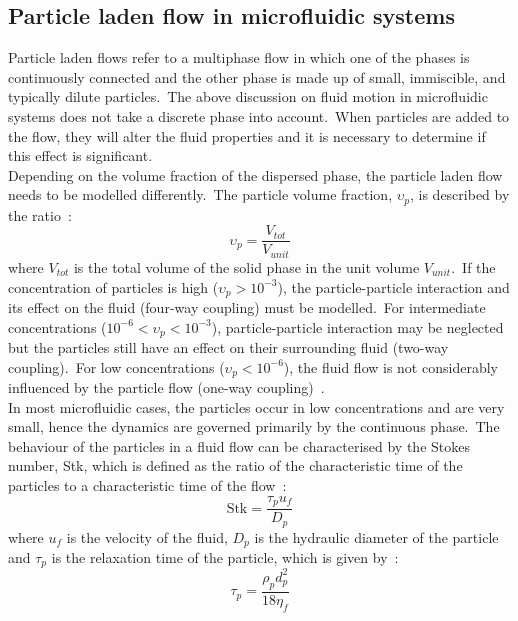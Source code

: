 \subsection{Particle laden flow in microfluidic systems}\label{subsec:particleLadenFlowInMicrofluidicSystems}
Particle laden flows refer to a multiphase flow in which one of the phases is continuously connected and the other phase is made up of small, immiscible, and typically dilute particles.\ The above discussion on fluid motion in microfluidic systems does not take a discrete phase into account.\ When particles are added to the flow, they will alter the fluid properties and it is necessary to determine if this effect is significant.\\
Depending on the volume fraction of the dispersed phase, the particle laden flow needs to be modelled differently.\ The particle volume fraction, $\upsilon_{p}$, is described by the ratio~\cite{Elghobashi1994}:\
\begin{equation}
	\upsilon_{p} = \frac{V_{tot}}{V_{unit}}
\end{equation}
where $V_{tot}$ is the total volume of the solid phase in the unit volume $V_{unit}$.\ If the concentration of particles is high ($\upsilon_{p}>10^{-3}$), the particle-particle interaction and its effect on the fluid (four-way coupling) must be modelled.\ For intermediate concentrations ($10^{-6} < \upsilon_{p} < 10^{-3}$), particle-particle interaction may be neglected but the particles still have an effect on their surrounding fluid (two-way coupling).\ For low concentrations ($\upsilon_{p} < 10^{-6}$), the fluid flow is not considerably influenced by the particle flow (one-way coupling)~\cite{Hryb2009}.\\
In most microfluidic cases, the particles occur in low concentrations and are very small, hence the dynamics are governed primarily by the continuous phase.\ The behaviour of the particles in a fluid flow can be characterised by the Stokes number, Stk, which is defined as the ratio of the characteristic time of the particles to a characteristic time of the flow~\cite{Happel2012}:\
\begin{equation}
 \text{Stk} = \frac{\tau_{p} u_{f}}{D_{p}}
\end{equation}
where $u_{f}$ is the velocity of the fluid, $D_{p}$ is the hydraulic diameter of the particle and $\tau_{p}$ is the relaxation time of the particle, which is given by~\cite{Happel2012}:
\begin{equation}
	\tau_{p} = \frac{\rho_{p}d_{p}^{2}}{18\eta_{f}}
\end{equation} 
